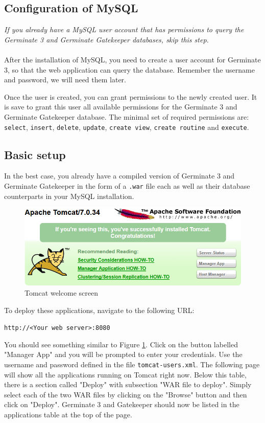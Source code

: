 \subsection{Configuration of MySQL}
\label{sec:mysql-basic}
\textit{If you already have a MySQL user account that has permissions to query the Germinate 3 and Germinate Gatekeeper databases, skip this step.}\\
\\
After the installation of MySQL, you need to create a user account for Germinate 3, so that the web application can query the database. Remember the username and password, we will need them later.

Once the user is created, you can grant permissions to the newly created user. It is save to grant this user all available permissions for the Germinate 3 and Germinate Gatekeeper database. The minimal set of required permissions are: \texttt{select}, \texttt{insert}, \texttt{delete}, \texttt{update}, \texttt{create view}, \texttt{create routine} and \texttt{execute}.

\subsection{Basic setup}
In the best case, you already have a compiled version of Germinate 3 and Germinate Gatekeeper in the form of a \texttt{.war} file each as well as their database counterparts in your MySQL installation. 

\begin{figure}
	\centering
	\includegraphics[scale=0.5]{img/setup/tomcat.png}
	\caption{Tomcat welcome screen}
	\label{fig:tomcat}
\end{figure}
\noindent
To deploy these applications, navigate to the following URL:
\begin{center}
	\texttt{http://<Your web server>:8080}
\end{center}
You should see something similar to Figure \ref{fig:tomcat}. Click on the button labelled "Manager App" and you will be prompted to enter your credentials. Use the username and password defined in the file \texttt{tomcat-users.xml}. The following page will show all the applications running on Tomcat right now. Below this table, there is a section called "Deploy" with subsection "WAR file to deploy". Simply select each of the two WAR files by clicking on the "Browse" button and then click on "Deploy". Germinate 3 and Gatekeeper should now be listed in the applications table at the top of the page.

